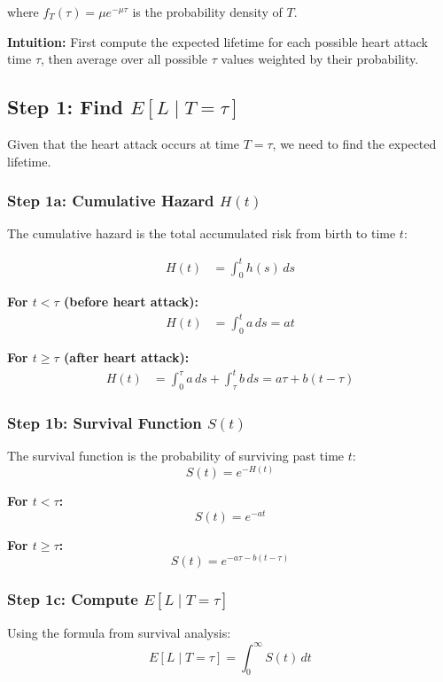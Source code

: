\documentclass[11pt]{article}
\begin{document}
where $f_T(\tau) = \mu e^{-\mu\tau}$ is the probability density of $T$.

\textbf{Intuition:} First compute the expected lifetime for each possible heart attack time $\tau$, then average over all possible $\tau$ values weighted by their probability.

\subsection*{Step 1: Find $E[L \mid T = \tau]$}

Given that the heart attack occurs at time $T = \tau$, we need to find the expected lifetime.

\subsubsection*{Step 1a: Cumulative Hazard $H(t)$}

The cumulative hazard is the total accumulated risk from birth to time $t$:

\begin{align*}
H(t) &= \int_0^t h(s) \, ds
\end{align*}

\textbf{For $t < \tau$ (before heart attack):}
\begin{align*}
H(t) &= \int_0^t a \, ds = at
\end{align*}

\textbf{For $t \geq \tau$ (after heart attack):}
\begin{align*}
H(t) &= \int_0^\tau a \, ds + \int_\tau^t b \, ds = a\tau + b(t - \tau)
\end{align*}

\subsubsection*{Step 1b: Survival Function $S(t)$}

The survival function is the probability of surviving past time $t$:
\[
S(t) = e^{-H(t)}
\]

\textbf{For $t < \tau$:}
\[
S(t) = e^{-at}
\]

\textbf{For $t \geq \tau$:}
\[
S(t) = e^{-a\tau - b(t-\tau)}
\]

\subsubsection*{Step 1c: Compute $E[L \mid T = \tau]$}

Using the formula from survival analysis:
\[
E[L \mid T = \tau] = \int_0^\infty S(t) \, dt
\]
\end{document}
